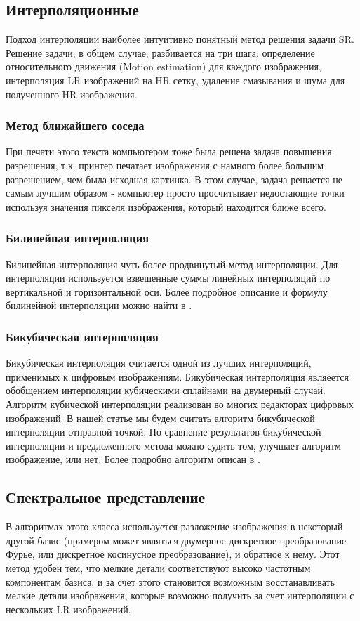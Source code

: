 \subsection{Интерполяционные} Подход интерполяции наиболее интуитивно понятный метод решения задачи SR. Решение задачи,
в общем случае, разбивается на три шага: определение относительного движения (Motion estimation) для каждого
изображения, интерполяция LR изображений на HR сетку, удаление смазывания и шума для полученного HR изображения.

\subsubsection{Метод ближайшего соседа}
При печати этого текста компьютером тоже была решена задача повышения разрешения, т.к. принтер печатает изображения с
намного более большим разрешением, чем была исходная картинка. В этом случае, задача решается не самым лучшим образом -
компьютер просто просчитывает недостающие точки используя значения пикселя изображения, который находится ближе всего.

\subsubsection{Билинейная интерполяция}
Билинейная интерполяция чуть более продвинутый метод интерполяции. Для интерполяции используется взвешенные суммы
линейных интерполяций по вертикальной и горизонтальной оси. Более подробное описание и формулу билинейной интерполяции
можно найти в \cite[стр. 64]{gonzalez2002woods}.

\subsubsection{Бикубическая интерполяция}
Бикубическая интерполяция считается одной из лучших интерполяций, применимых к цифровым изображениям. Бикубическая
интерполяция являеется обобщением интерполяции кубическими сплайнами на двумерный случай. Алгоритм кубической
интерполяции реализован во многих редакторах цифровых изображений. В нашей статье мы будем считать алгоритм бикубической
интерполяции отправной точкой. По сравнение результатов бикубической интерполяции и предложенного метода можно судить
том, улучшает алгоритм изображение, или нет. Более подробно алгоритм описан в  \cite{keys1981cubic}.

\subsection{Спектральное представление}
В алгоритмах этого класса используется разложение изображения в некоторый другой
базис (примером может являться двумерное дискретное преобразование Фурье, или дискретное косинусное преобразование), и
обратное к нему.  Этот метод удобен тем, что мелкие детали соответствуют высоко частотным компонентам базиса, и за счет
этого становится возможным восстанавливать мелкие детали изображения, которые возможно получить за счет интерполяции с
нескольких LR изображений.

